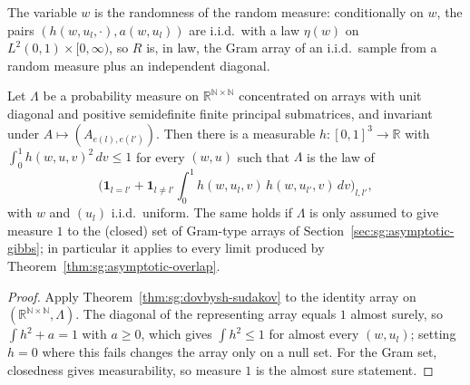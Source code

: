 The variable $w$ is the randomness of the random measure: conditionally on $w$, the pairs $(h(w,u_l,\cdot),a(w,u_l))$ are i.i.d.\ with a law $\eta(w)$ on $L^2(0,1)\times[0,\infty)$, so $R$ is, in law, the Gram array of an i.i.d.\ sample from a random measure plus an independent diagonal.

\begin{theorem}\label{thm:sg:dovbysh-sudakov-gram}
  \leanok
Let $\Lambda$ be a probability measure on $\mathbb R^{\mathbb N\times\mathbb N}$ concentrated on arrays with unit diagonal and positive semidefinite finite principal submatrices, and invariant under $A\mapsto(A_{e(l),e(l')})$. Then there is a measurable $h:[0,1]^3\to\mathbb R$ with $\int_0^1h(w,u,v)^2\,dv\le1$ for every $(w,u)$ such that $\Lambda$ is the law of
\[\Big(\mathbf 1_{l=l'}+\mathbf 1_{l\ne l'}\int_0^1h(w,u_l,v)\,h(w,u_{l'},v)\,dv\Big)_{l,l'},\]
with $w$ and $(u_l)$ i.i.d.\ uniform. The same holds if $\Lambda$ is only assumed to give measure $1$ to the (closed) set of Gram-type arrays of Section~\ref{sec:sg:asymptotic-gibbs}; in particular it applies to every limit produced by Theorem~\ref{thm:sg:asymptotic-overlap}.
\end{theorem}

\begin{proof}
  \leanok
{}
Apply Theorem~\ref{thm:sg:dovbysh-sudakov} to the identity array on $(\mathbb R^{\mathbb N\times\mathbb N},\Lambda)$. The diagonal of the representing array equals $1$ almost surely, so $\int h^2+a=1$ with $a\ge0$, which gives $\int h^2\le1$ for almost every $(w,u_l)$; setting $h=0$ where this fails changes the array only on a null set. For the Gram set, closedness gives measurability, so measure $1$ is the almost sure statement.
\end{proof}


